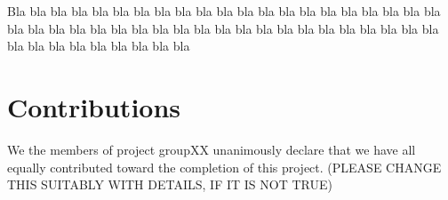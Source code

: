 \documentclass[a4paper,12pt]{article}
\begin{document}
Bla bla bla bla bla bla bla bla bla bla bla bla bla bla bla bla bla 
bla bla bla bla bla bla bla bla bla bla bla bla bla bla bla bla bla 
bla bla bla bla bla bla bla bla bla bla bla bla bla bla bla bla bla 


\section{Contributions}
\label{sec:contributions}
We the members of project groupXX unanimously declare that 
we have all equally contributed toward the completion of this
project. (PLEASE CHANGE THIS SUITABLY WITH DETAILS, IF IT IS NOT TRUE)



\nocite{*}


\end{document}
